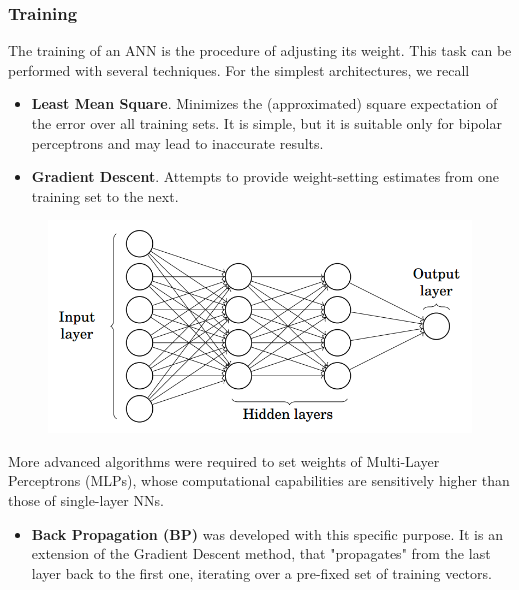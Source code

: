 \documentclass{beamer}
\begin{document}
\begin{frame}
\frametitle{Training}
The training of an ANN is the procedure of adjusting its weight. This task can be performed with several techniques. For the simplest architectures, we recall
\begin{itemize}
\item \textbf{Least Mean Square}. Minimizes the (approximated) square expectation of the error over all training sets. It is simple, but it is suitable only for bipolar perceptrons and may lead to inaccurate results.
\item \textbf{Gradient Descent}. Attempts to provide weight-setting estimates from one training set to the next.
\end{itemize}
\end{frame}

\begin{frame}
\begin{figure}
\includegraphics[height = 0.4\textheight]{"pictures/multilayer-perceptron.png"}
\end{figure}
More advanced algorithms were required to set weights of Multi-Layer Perceptrons (MLPs), whose computational capabilities are sensitively higher than those of single-layer NNs. 
\begin{itemize}
\item \textbf{Back Propagation (BP)} was developed with this specific purpose. It is an extension of the Gradient Descent method, that "propagates" from the last layer back to the first one, iterating over a pre-fixed set of training vectors.
\end{itemize}
\end{frame}
\end{document}
